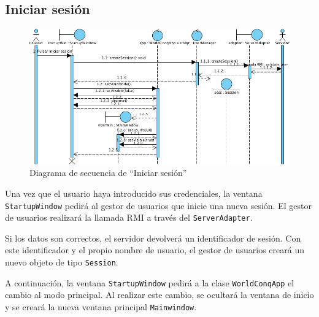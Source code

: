 \subsection{Iniciar sesión}

\begin{figure}[ht]
\centering
\includegraphics[scale=0.6]{img/ch03devel-login.png}
\caption{Diagrama de secuencia de ``Iniciar sesión''}
\end{figure}

Una vez que el usuario haya introducido sus credenciales, la ventana
\texttt{StartupWindow} pedirá al gestor de usuarios que inicie una nueva
sesión. El gestor de usuarios realizará la llamada RMI a través del
\texttt{ServerAdapter}.

Si los datos son correctos, el servidor devolverá un identificador de sesión.
Con este identificador y el propio nombre de usuario, el gestor de usuarios
creará un nuevo objeto de tipo \texttt{Session}.

A continuación, la ventana \texttt{StartupWindow} pedirá a la clase
\texttt{WorldConqApp} el cambio al modo principal. Al realizar este cambio, se
ocultará la ventana de inicio y se creará la nueva ventana principal
\texttt{Mainwindow}.

